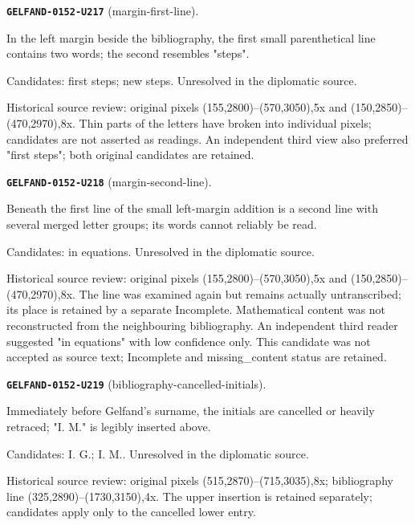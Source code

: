 \par\noindent\leavevmode{}\label{GELFAND-0152-U217}\textbf{\texttt{GELFAND-0152-U217}} (margin-first-line).\nopagebreak[4]\par
In the left margin beside the bibliography, the first small parenthetical line contains two words; the second resembles "steps".\par
Candidates: first steps; new steps. Unresolved in the diplomatic source.\par
Historical source review: original pixels (155,2800)–(570,3050),5x and (150,2850)–(470,2970),8x. Thin parts of the letters have broken into individual pixels; candidates are not asserted as readings. An independent third view also preferred "first steps"; both original candidates are retained.\par\medskip
\par\noindent\leavevmode{}\label{GELFAND-0152-U218}\textbf{\texttt{GELFAND-0152-U218}} (margin-second-line).\nopagebreak[4]\par
Beneath the first line of the small left-margin addition is a second line with several merged letter groups; its words cannot reliably be read.\par
Candidates: in equations. Unresolved in the diplomatic source.\par
Historical source review: original pixels (155,2800)–(570,3050),5x and (150,2850)–(470,2970),8x. The line was examined again but remains actually untranscribed; its place is retained by a separate Incomplete. Mathematical content was not reconstructed from the neighbouring bibliography. An independent third reader suggested "in equations" with low confidence only. This candidate was not accepted as source text; Incomplete and missing\_content status are retained.\par\medskip
\par\noindent\leavevmode{}\label{GELFAND-0152-U219}\textbf{\texttt{GELFAND-0152-U219}} (bibliography-cancelled-initials).\nopagebreak[4]\par
Immediately before Gelfand's surname, the initials are cancelled or heavily retraced; "I. M." is legibly inserted above.\par
Candidates: I. G.; I. M.. Unresolved in the diplomatic source.\par
Historical source review: original pixels (515,2870)–(715,3035),8x; bibliography line (325,2890)–(1730,3150),4x. The upper insertion is retained separately; candidates apply only to the cancelled lower entry.\par\medskip
